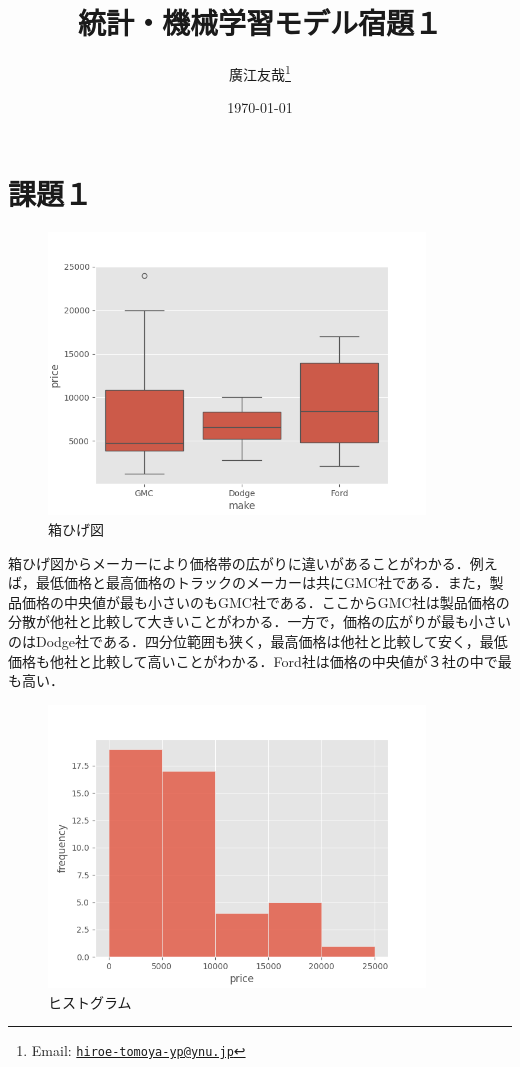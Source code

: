 \documentclass[article]{jlreq}
\title{統計・機械学習モデル宿題１}
\author{廣江友哉\;2125178\thanks{Email: \texttt{\href{hiroe-tomoya-yp@ynu.jp}{hiroe-tomoya-yp@ynu.jp}}}}
\date{\today}
\begin{document}
\maketitle

\tableofcontents



\section{課題１}

\begin{figure}[H]
  \centering
  \includegraphics[width=100mm]{../plots/hw1/boxplot.png}
  \caption{箱ひげ図}
\end{figure}

箱ひげ図からメーカーにより価格帯の広がりに違いがあることがわかる．例えば，最低価格と最高価格のトラックのメーカーは共にGMC社である．また，製品価格の中央値が最も小さいのもGMC社である．ここからGMC社は製品価格の分散が他社と比較して大きいことがわかる．一方で，価格の広がりが最も小さいのはDodge社である．四分位範囲も狭く，最高価格は他社と比較して安く，最低価格も他社と比較して高いことがわかる．Ford社は価格の中央値が３社の中で最も高い．

\begin{figure}[H]
  \centering
  \includegraphics[width=100mm]{../plots/hw1/histogram.png}
  \caption{ヒストグラム}
\end{figure}
\end{document}
